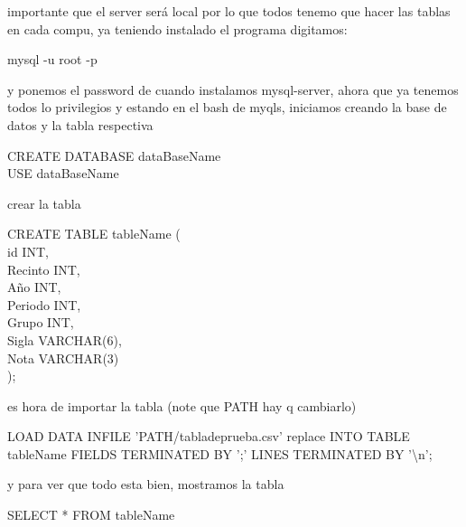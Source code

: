 \documentclass[11pt]{article} %
\begin{document}
importante que el server será local por lo que todos tenemo que hacer las tablas en cada compu, ya teniendo instalado el programa digitamos:
\begin{shaded}
mysql -u root -p\\
\end{shaded}
y ponemos el password de cuando instalamos mysql-server, ahora que ya tenemos todos lo privilegios y estando en el bash de myqls, iniciamos creando la base de datos y la tabla respectiva
\begin{shaded}
CREATE DATABASE dataBaseName\\
USE dataBaseName\\
\end{shaded}
crear la tabla
\begin{shaded}
CREATE TABLE tableName (\\
	id INT,\\
	Recinto INT,\\ 
	Año INT,\\ 
	Periodo INT,\\ 
	Grupo INT,\\ 
	Sigla VARCHAR(6),\\ 
	Nota VARCHAR(3)\\
	);
\end{shaded}
es hora de importar la tabla (note que PATH hay q cambiarlo)
\begin{shaded}
LOAD DATA INFILE 'PATH/tabladeprueba.csv' replace INTO TABLE tableName FIELDS TERMINATED BY ';' LINES TERMINATED BY '\textbackslash n';
\end{shaded}
y para ver que todo esta bien, mostramos la tabla
\begin{shaded}
SELECT * FROM tableName
\end{shaded}

	
\end{document}
